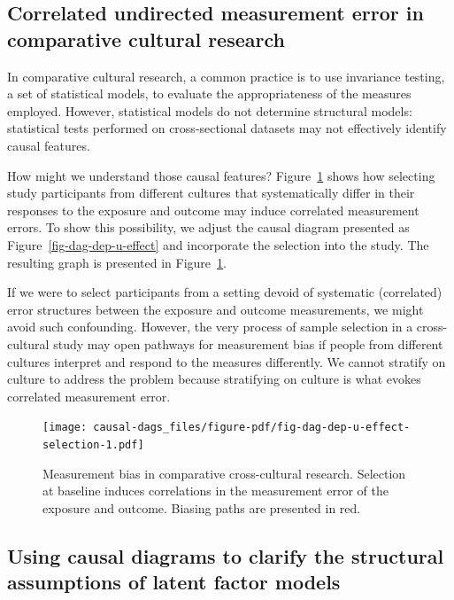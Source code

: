 \documentclass[
  singlecolumn]{report}
\begin{document}
\hypertarget{correlated-undirected-measurement-error-in-comparative-cultural-research}{%
\subsection{Correlated undirected measurement error in comparative
cultural
research}\label{correlated-undirected-measurement-error-in-comparative-cultural-research}}

In comparative cultural research, a common practice is to use invariance
testing, a set of statistical models, to evaluate the appropriateness of
the measures employed. However, statistical models do not determine
structural models: statistical tests performed on cross-sectional
datasets may not effectively identify causal features.

How might we understand those causal features?
Figure~\ref{fig-dag-dep-u-effect-selection} shows how selecting study
participants from different cultures that systematically differ in their
responses to the exposure and outcome may induce correlated measurement
errors. To show this possibility, we adjust the causal diagram presented
as Figure~\ref{fig-dag-dep-u-effect} and incorporate the selection into
the study. The resulting graph is presented in
Figure~\ref{fig-dag-dep-u-effect-selection}.

If we were to select participants from a setting devoid of systematic
(correlated) error structures between the exposure and outcome
measurements, we might avoid such confounding. However, the very process
of sample selection in a cross-cultural study may open pathways for
measurement bias if people from different cultures interpret and respond
to the measures differently. We cannot stratify on culture to address
the problem because stratifying on culture is what evokes correlated
measurement error.

\begin{figure}

{\centering \texttt{[image: causal-dags\_files/figure-pdf/fig-dag-dep-u-effect-selection-1.pdf]}

}

\caption{\label{fig-dag-dep-u-effect-selection}Measurement bias in
comparative cross-cultural research. Selection at baseline induces
correlations in the measurement error of the exposure and outcome.
Biasing paths are presented in red.}

\end{figure}

\hypertarget{using-causal-diagrams-to-clarify-the-structural-assumptions-of-latent-factor-models}{%
\subsection{Using causal diagrams to clarify the structural assumptions
of latent factor
models}\label{using-causal-diagrams-to-clarify-the-structural-assumptions-of-latent-factor-models}}
\end{document}
